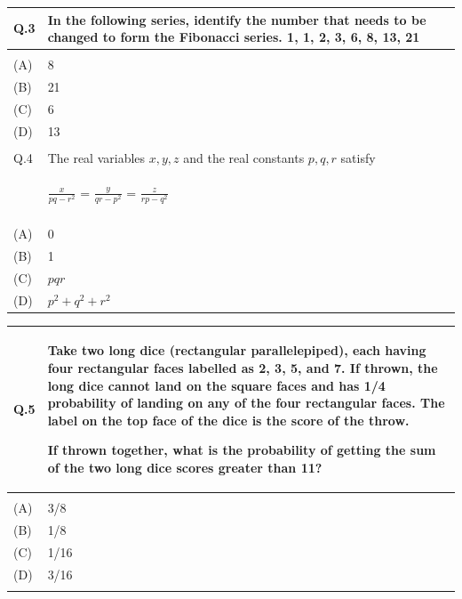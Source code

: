 \documentclass[12pt]{article}
\begin{document}
\newpage

\begin{table}[H]
\renewcommand{\arraystretch}{3}
\setlength{\tabcolsep}{8pt}
\begin{tabular}{|l|p{15cm}|}
\hline
Q.3 & In the following series, identify the number that needs to be changed to form the
Fibonacci series. 1, 1, 2, 3, 6, 8, 13, 21 \\ \hline
 & \\ \hline
(A)&8\\ \hline
(B)&21\\ \hline
(C)&6 \\ \hline
(D)&13\\ \hline
 & \\ \hline
Q.4 & The real variables $x,y,z$ and the real constants $p,q,r$ satisfy  \\ & \begin{Large} $\frac{x}{pq-r^2}$ =     $\frac{y}{qr-p^2}$ = $\frac{z}{rp-q^2}$ \end{Large} \\ \hline 
 & \\ \hline
(A)&0 \\ \hline
(B)&1 \\ \hline
(C)&$pqr$ \\ \hline
(D)&$p^2 + q^2 + r^2$  \\ \hline
 



\end{tabular}
\end{table}




\newpage

\begin{table}[H]
\renewcommand{\arraystretch}{3}
\setlength{\tabcolsep}{8pt}
\begin{tabular}{|l|p{15cm}|}
\hline
Q.5 &Take two long dice (rectangular parallelepiped), each having four rectangular faces
labelled as 2, 3, 5, and 7. If thrown, the long dice cannot land on the square faces
and has 1/4 probability of landing on any of the four rectangular faces. The label on
the top face of the dice is the score of the throw. 

If thrown together, what is the probability of getting the sum of the two long dice
scores greater than 11? \\ \hline
 & \\ \hline
(A)&3/8\\ \hline
(B)&1/8\\ \hline
(C)&1/16 \\ \hline
(D)&3/16\\ \hline
 & \\ \hline
\end{tabular}
\end{table}
\end{document}
